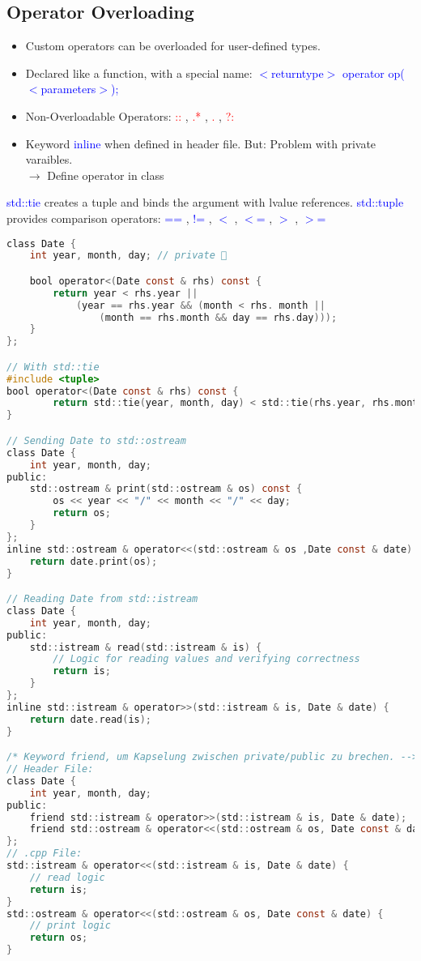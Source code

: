 \subsection{Operator Overloading}
\begin{itemize}
    \item Custom operators can be overloaded for user-defined types.
    \item Declared like a function, with a special name: \textcolor{blue}{$<$returntype$>$ operator op($<$parameters$>$);}
    \item Non-Overloadable Operators: \textcolor{red}{::} , \textcolor{red}{.*} , \textcolor{red}{.} , \textcolor{red}{?:}
    \item Keyword \textcolor{blue}{inline} when defined in header file. But: Problem with private varaibles.\\
    $\rightarrow$ Define operator in class
\end{itemize}
\textcolor{blue}{std::tie} creates a tuple and binds the argument with lvalue references. \textcolor{blue}{std::tuple} provides comparison operators: \textcolor{blue}{==} , \textcolor{blue}{!=} , \textcolor{blue}{$<$} , \textcolor{blue}{$<$=} , \textcolor{blue}{$>$} , \textcolor{blue}{$>$=}

\begin{lstlisting}[style=frame, style= linenumbers, language=C]
class Date {
    int year, month, day; // private 

    bool operator<(Date const & rhs) const {
        return year < rhs.year ||
            (year == rhs.year && (month < rhs. month ||
                (month == rhs.month && day == rhs.day)));
    }
};

// With std::tie
#include <tuple>
bool operator<(Date const & rhs) const {
        return std::tie(year, month, day) < std::tie(rhs.year, rhs.month, rhs.day);
}

// Sending Date to std::ostream
class Date {
    int year, month, day;
public:
    std::ostream & print(std::ostream & os) const {
        os << year << "/" << month << "/" << day;
        return os;
    }
};
inline std::ostream & operator<<(std::ostream & os ,Date const & date) {
    return date.print(os);
}

// Reading Date from std::istream
class Date {
    int year, month, day;
public:
    std::istream & read(std::istream & is) {
        // Logic for reading values and verifying correctness
        return is;
    }
};
inline std::istream & operator>>(std::istream & is, Date & date) {
    return date.read(is);
}

/* Keyword friend, um Kapselung zwischen private/public zu brechen. --> Dann ist es möglich die read/print Operatoren ohne inline Hilfsfunktionen zu schreiben. */
// Header File:
class Date {
    int year, month, day;
public:
    friend std::istream & operator>>(std::istream & is, Date & date);
    friend std::ostream & operator<<(std::ostream & os, Date const & date);
};
// .cpp File:
std::istream & operator<<(std::istream & is, Date & date) {
    // read logic
    return is;
}
std::ostream & operator<<(std::ostream & os, Date const & date) {
    // print logic
    return os;
}
\end{lstlisting}

